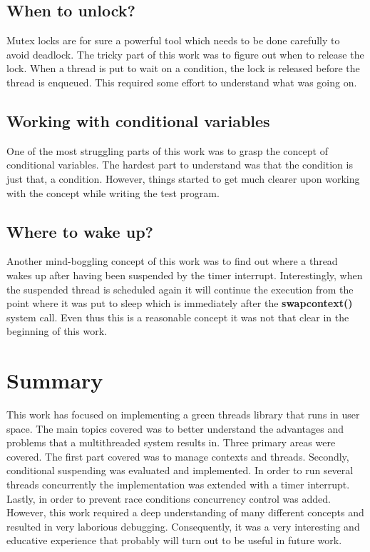 \documentclass{article}
\begin{document}
\subsection{When to unlock?}
Mutex locks are for sure a powerful tool which needs to be done carefully to avoid deadlock. The tricky part of this work was to figure out when to release the lock. When a thread is put to wait on a condition, the lock is released before the thread is enqueued. This required some effort to understand what was going on. 

\subsection{Working with conditional variables}
One of the most struggling parts of this work was to grasp the concept of conditional variables. The hardest part to understand was that the condition is just that, a condition. However, things started to get much clearer upon working with the concept while writing the test program.

\subsection{Where to wake up?}
Another mind-boggling concept of this work was to find out where a thread wakes up after having been suspended by the timer interrupt. Interestingly, when the suspended thread is scheduled again it will continue the execution from the point where it was put to sleep which is immediately after the \textbf{swapcontext()} system call. Even thus this is a reasonable concept it was not that clear in the beginning of this work. 


\section{Summary}
This work has focused on implementing a green threads library that runs in user space. The main topics covered was to better understand the advantages and problems that a multithreaded system results in. Three primary areas were covered. The first part covered was to manage contexts and threads. Secondly, conditional suspending was evaluated and implemented. In order to run several threads concurrently the implementation was extended with a timer interrupt. Lastly, in order to prevent race conditions concurrency control was added. However, this work required a deep understanding of many different concepts and resulted in very laborious debugging. Consequently, it was a very interesting and educative experience that probably will turn out to be useful in future work. 
\end{document}
